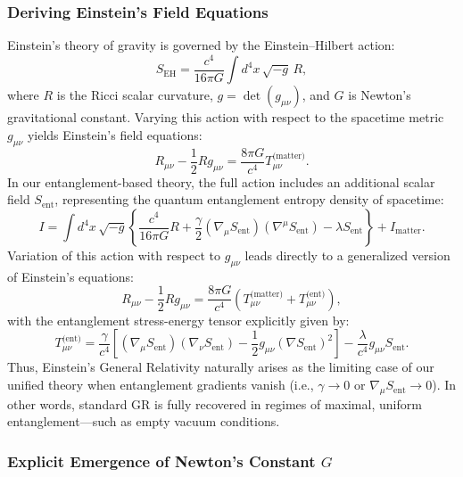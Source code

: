 \documentclass[11pt]{article}
\begin{document}
\subsubsection*{Deriving Einstein's Field Equations} %

Einstein's theory of gravity is governed by the Einstein–Hilbert action:
\begin{equation*}
S_{\text{EH}} = \frac{c^4}{16\pi G} \int d^4x\,\sqrt{-g}\,R,
\end{equation*}
where $R$ is the Ricci scalar curvature, $g = \det(g_{\mu\nu})$, and $G$ is Newton's gravitational constant. Varying this action with respect to the spacetime metric $g_{\mu\nu}$ yields Einstein's field equations:
\begin{equation*}
R_{\mu\nu} - \frac{1}{2} R g_{\mu\nu} = \frac{8\pi G}{c^4} T_{\mu\nu}^{\text{(matter)}}.
\end{equation*}
In our entanglement-based theory, the full action includes an additional scalar field $S_{\text{ent}}$, representing the quantum entanglement entropy density of spacetime:
\begin{equation*}
I = \int d^4x\,\sqrt{-g}\left\{\frac{c^4}{16\pi G}R + \frac{\gamma}{2}(\nabla_\mu S_{\text{ent}})(\nabla^\mu S_{\text{ent}}) - \lambda S_{\text{ent}}\right\} + I_{\text{matter}}.
\end{equation*}
Variation of this action with respect to $g_{\mu\nu}$ leads directly to a generalized version of Einstein’s equations:
\begin{equation*}
R_{\mu\nu} - \frac{1}{2} R g_{\mu\nu} = \frac{8\pi G}{c^4}\left(T_{\mu\nu}^{\text{(matter)}} + T_{\mu\nu}^{\text{(ent)}}\right),
\end{equation*}
with the entanglement stress-energy tensor explicitly given by:
\begin{equation*}
T_{\mu\nu}^{\text{(ent)}} = \frac{\gamma}{c^4}\left[(\nabla_\mu S_{\text{ent}})(\nabla_\nu S_{\text{ent}})-\frac{1}{2}g_{\mu\nu}(\nabla S_{\text{ent}})^2\right] - \frac{\lambda}{c^4}g_{\mu\nu}S_{\text{ent}}.
\end{equation*}
Thus, Einstein’s General Relativity naturally arises as the limiting case of our unified theory when entanglement gradients vanish (i.e., $\gamma \rightarrow 0$ or $\nabla_\mu S_{\text{ent}} \rightarrow 0$). In other words, standard GR is fully recovered in regimes of maximal, uniform entanglement—such as empty vacuum conditions.

\subsubsection*{Explicit Emergence of Newton’s Constant $G$}
\end{document}
